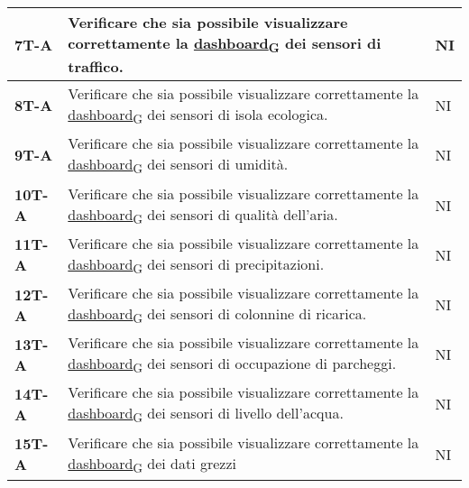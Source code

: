 \begin{longtable}{|>{\raggedright\arraybackslash}m{}|>{\raggedright\arraybackslash}m{}|>{\raggedright\arraybackslash}m{}|}
	\hline
	\textbf{7T-A}   & Verificare che sia possibile visualizzare correttamente la \href{https://7last.github.io/docs/pb/documentazione-interna/glossario\#dashboard}{dashboard\textsubscript{G}} dei sensori di traffico.                          & NI             \\
	\hline
	\textbf{8T-A}   & Verificare che sia possibile visualizzare correttamente la \href{https://7last.github.io/docs/pb/documentazione-interna/glossario\#dashboard}{dashboard\textsubscript{G}} dei sensori di isola ecologica.                   & NI             \\
	\hline
	\textbf{9T-A}   & Verificare che sia possibile visualizzare correttamente la \href{https://7last.github.io/docs/pb/documentazione-interna/glossario\#dashboard}{dashboard\textsubscript{G}} dei sensori di umidità.                           & NI             \\
	\hline
	\textbf{10T-A}  & Verificare che sia possibile visualizzare correttamente la \href{https://7last.github.io/docs/pb/documentazione-interna/glossario\#dashboard}{dashboard\textsubscript{G}} dei sensori di qualità dell'aria.                 & NI             \\
	\hline
	\textbf{11T-A}  & Verificare che sia possibile visualizzare correttamente la \href{https://7last.github.io/docs/pb/documentazione-interna/glossario\#dashboard}{dashboard\textsubscript{G}} dei sensori di precipitazioni.                    & NI             \\
	\hline
	\textbf{12T-A}  & Verificare che sia possibile visualizzare correttamente la \href{https://7last.github.io/docs/pb/documentazione-interna/glossario\#dashboard}{dashboard\textsubscript{G}} dei sensori di colonnine di ricarica.             & NI             \\
	\hline
	\textbf{13T-A}  & Verificare che sia possibile visualizzare correttamente la \href{https://7last.github.io/docs/pb/documentazione-interna/glossario\#dashboard}{dashboard\textsubscript{G}} dei sensori di occupazione di parcheggi.          & NI             \\
	\hline
	\textbf{14T-A}  & Verificare che sia possibile visualizzare correttamente la \href{https://7last.github.io/docs/pb/documentazione-interna/glossario\#dashboard}{dashboard\textsubscript{G}} dei sensori di livello dell'acqua.                & NI             \\
	\hline
	\textbf{15T-A}  & Verificare che sia possibile visualizzare correttamente la \href{https://7last.github.io/docs/pb/documentazione-interna/glossario\#dashboard}{dashboard\textsubscript{G}} dei dati grezzi                                   & NI             \\

\end{longtable}

